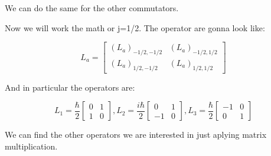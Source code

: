 We can do the same for the other commutators.

Now we will work the math or j=1/2. The operator are gonna look like:

\begin{equation}
  L_a =
    \left[\begin{matrix}
      (L_a)_{-1/2,-1/2} & (L_a)_{-1/2,1/2}\\
      (L_a)_{1/2,-1/2} & (L_a)_{1/2,1/2}
    \end{matrix}\right]
\end{equation}

And in particular the operators are:

\begin{equation}
  \label{9.48}
  L_1 = \frac{\hbar}{2}
    \left[\begin{matrix}
      0 & 1\\
      1 & 0
    \end{matrix}\right],
  L_2 = \frac{i\hbar}{2}
    \left[\begin{matrix}
      0 & 1\\
      -1 & 0
    \end{matrix}\right],
  L_3 = \frac{\hbar}{2}
    \left[\begin{matrix}
      -1 & 0\\
      0 & 1
    \end{matrix}\right]
\end{equation}

We can find the other operators we are interested in just aplying matrix multiplication.

